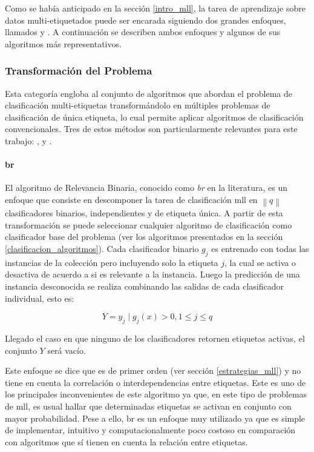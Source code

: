 Como se había anticipado en la sección \ref{intro_mll}, la tarea de aprendizaje
sobre datos multi-etiquetados puede ser encarada siguiendo dos grandes enfoques,
llamados  y . A continuación se describen ambos enfoques y algunos de sus
algoritmos más representativos.

\subsubsection{Transformación del Problema}

Esta categoría engloba al conjunto de algoritmos que abordan el problema de
clasificación multi-etiquetas transformándolo en múltiples problemas de
clasificación de única etiqueta, lo cual permite aplicar algoritmos de
clasificación convencionales. Tres de estos métodos son particularmente
relevantes para este trabajo: ,  y
.

\paragraph{\acrfull{br}}

El algoritmo de Relevancia Binaria, conocido como \textit{\acrlong{br}} en la
literatura, es un enfoque que consiste en descomponer la tarea de clasificación
\acrshort{mll} en $\left\|q\right\|$ clasificadores binarios, independientes y
de etiqueta única.  A partir de esta transformación se puede seleccionar
cualquier algoritmo de clasificación como clasificador base del problema (ver
los algoritmos presentados en la sección \ref{clasificacion_algoritmos}).  Cada
clasificador binario $g_{j}$ es entrenado con todas las instancias de la
colección pero incluyendo solo la etiqueta $j$, la cual se activa o desactiva de
acuerdo a si es relevante a la instancia. Luego la predicción de una instancia
desconocida se realiza combinando las salidas de cada clasificador individual,
esto es:

\begin{equation}
	Y = {y_{j} \mid g_{j}(x) > 0, 1 \leq j \leq q}
\end{equation}

Llegado el caso en que ninguno de los clasificadores retornen etiquetas activas,
el conjunto $Y$ será vacío.

Este enfoque se dice que es de primer orden (ver sección \ref{estrategias_mll})
y no tiene en cuenta la correlación o interdependencias entre etiquetas. Este es
uno de los principales inconvenientes de este algoritmo ya que, en este tipo de
problemas de \acrshort{mll}, es usual hallar que determinadas etiquetas se
activan en conjunto con mayor probabilidad. Pese a ello, \acrshort{br} es un
enfoque muy utilizado \cite{zhang_review_2014} ya que es simple de implementar,
intuitivo y computacionalmente poco costoso en comparación con algoritmos que sí
tienen en cuenta la relación entre etiquetas.

